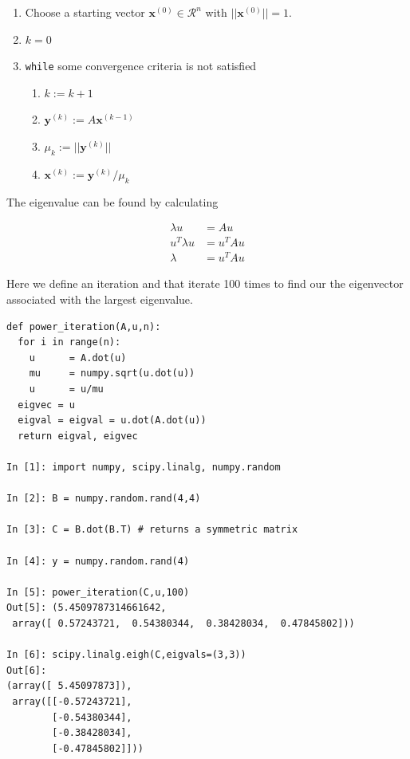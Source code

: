 \documentclass[12pt,]{book}
\providecommand{\tightlist}{%
  \setlength{\itemsep}{0pt}\setlength{\parskip}{0pt}}
\begin{document}
\begin{enumerate}
\def\labelenumi{\arabic{enumi}.}
\item
  Choose a starting vector \(\mathbf{x}^{(0)}\in\mathcal{R}^n\) with
  \(\rvert\rvert\mathbf{x}^{(0)}\rvert\rvert=1\).
\item
  \(k=0\)
\item
  \texttt{while} some convergence criteria is not satisfied

  \begin{enumerate}
  \def\labelenumii{\roman{enumii}.}
  \tightlist
  \item
    \(k:=k+1\)
  \item
    \(\mathbf{y}^{(k)}:=A\mathbf{x}^{(k-1)}\)
  \item
    \(\mu_k:=\rvert\rvert\mathbf{y}^{(k)}\rvert\rvert\)
  \item
    \(\mathbf{x}^{(k)}:=\mathbf{y}^{(k)}/\mu_k\)
  \end{enumerate}
\end{enumerate}

The eigenvalue can be found by calculating

\begin{align*}
\lambda u &= A u\\
u^T\lambda u &= u^TA u\\
\lambda &= u^TAu \tag{because $u$ is normalized}
\end{align*}

\vfill

\pagebreak

Here we define an iteration and that iterate 100 times to find our the
eigenvector associated with the largest eigenvalue.

\begin{verbatim}
def power_iteration(A,u,n):
  for i in range(n):
    u      = A.dot(u)
    mu     = numpy.sqrt(u.dot(u))
    u      = u/mu
  eigvec = u
  eigval = eigval = u.dot(A.dot(u))
  return eigval, eigvec

In [1]: import numpy, scipy.linalg, numpy.random

In [2]: B = numpy.random.rand(4,4)

In [3]: C = B.dot(B.T) # returns a symmetric matrix

In [4]: y = numpy.random.rand(4)

In [5]: power_iteration(C,u,100)
Out[5]: (5.4509787314661642,
 array([ 0.57243721,  0.54380344,  0.38428034,  0.47845802]))

In [6]: scipy.linalg.eigh(C,eigvals=(3,3))
Out[6]:
(array([ 5.45097873]), 
 array([[-0.57243721],
        [-0.54380344],
        [-0.38428034],
        [-0.47845802]]))
\end{verbatim}
\end{document}
